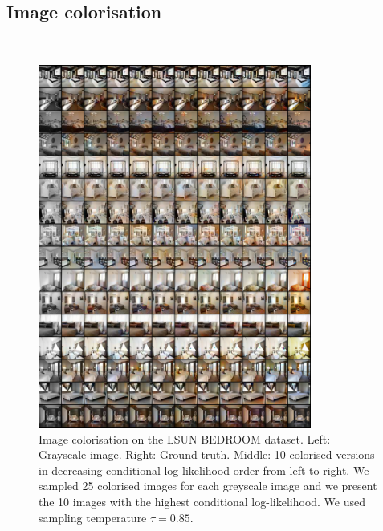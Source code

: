 \subsection{Image colorisation}\ 
\begin{figure}[h!]
    \centering
    \includegraphics[width=0.8\textwidth]{Chapter1/paper_graphs/SupplementaryMaterial/colorisation_lsun_0.85.png}
    \caption{Image colorisation on the LSUN BEDROOM dataset. Left: Grayscale image. Right: Ground truth. Middle: 10 colorised versions in decreasing conditional log-likelihood order from left to right. We sampled 25 colorised images for each greyscale image and we present the 10 images with the highest conditional log-likelihood. We used sampling temperature $\tau=0.85$.}
\end{figure}

